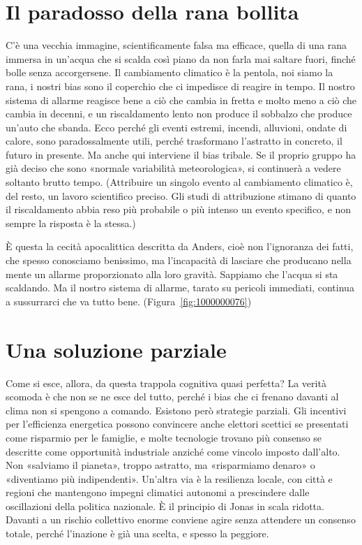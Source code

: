 \section{Il paradosso della rana bollita}

C'\`{e} una vecchia immagine, scientificamente falsa ma efficace, quella di una rana immersa in un'acqua che si scalda cos\`{i} piano da non farla mai saltare fuori, finch\'{e} bolle senza accorgersene. Il cambiamento climatico \`{e} la pentola, noi siamo la rana, i nostri bias sono il coperchio che ci impedisce di reagire in tempo. Il nostro sistema di allarme reagisce bene a ciò che cambia in fretta e molto meno a ciò che cambia in decenni, e un riscaldamento lento non produce il sobbalzo che produce un'auto che sbanda. Ecco perch\'{e} gli eventi estremi, incendi, alluvioni, ondate di calore, sono paradossalmente utili, perch\'{e} trasformano l'astratto in concreto, il futuro in presente. Ma anche qui interviene il bias tribale. Se il proprio gruppo ha gi\`{a} deciso che sono «normale variabilit\`{a} meteorologica», si continuer\`{a} a vedere soltanto brutto tempo. (Attribuire un singolo evento al cambiamento climatico è, del resto, un lavoro scientifico preciso. Gli studi di attribuzione stimano di quanto il riscaldamento abbia reso più probabile o più intenso un evento specifico, e non sempre la risposta è la stessa.)

\`{E} questa la cecit\`{a} apocalittica descritta da Anders, cio\`{e} non l'ignoranza dei fatti, che spesso conosciamo benissimo, ma l'incapacit\`{a} di lasciare che producano nella mente un allarme proporzionato alla loro gravit\`{a}. Sappiamo che l'acqua si sta scaldando. Ma il nostro sistema di allarme, tarato su pericoli immediati, continua a sussurrarci che va tutto bene. (Figura~\ref{fig:1000000076})

\section{Una soluzione parziale}

Come si esce, allora, da questa trappola cognitiva quasi perfetta? La verit\`{a} scomoda \`{e} che non se ne esce del tutto, perch\'{e} i bias che ci frenano davanti al clima non si spengono a comando. Esistono per\`{o} strategie parziali. Gli incentivi per l'efficienza energetica possono convincere anche elettori scettici se presentati come risparmio per le famiglie, e molte tecnologie trovano pi\`{u} consenso se descritte come opportunit\`{a} industriale anzich\'{e} come vincolo imposto dall'alto. Non «salviamo il pianeta», troppo astratto, ma «risparmiamo denaro» o «diventiamo pi\`{u} indipendenti». Un'altra via \`{e} la resilienza locale, con citt\`{a} e regioni che mantengono impegni climatici autonomi a prescindere dalle oscillazioni della politica nazionale. \`{E} il principio di Jonas in scala ridotta. Davanti a un rischio collettivo enorme conviene agire senza attendere un consenso totale, perch\'{e} l'inazione \`{e} gi\`{a} una scelta, e spesso la peggiore.

